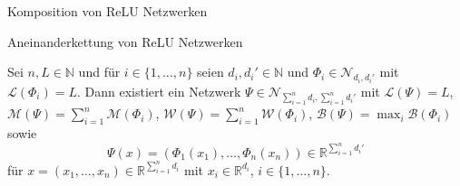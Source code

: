 \documentclass[10pt,aspectratio=169]{beamer}
\newcommand{\N}{\mathbb{N}} %
\newcommand{\R}{\mathbb{R}} %
\newcommand{\set}[1]{\{#1\}}
\begin{document}
\begin{frame}{Komposition von ReLU Netzwerken}
    \centering
\end{frame}

\begin{frame}{Aneinanderkettung von ReLU Netzwerken}
    \begin{lemma}
        Sei \(n, L \in\N\) und für \(i\in \set{1,\ldots, n}\) seien \(d_i, d_i' \in \N\) und \(\Phi_i \in \mathcal{N}_{d_i, d_i'}\) 
        mit \(\mathcal{L}(\Phi_i) = L\). Dann existiert ein Netzwerk \(\Psi \in \mathcal{N}_{\sum_{i=1}^n d_i, \sum_{i=1}^n d_i'}\) 
        mit \(\mathcal{L}(\Psi) = L\), \(\mathcal{M}(\Psi) = \sum_{i=1}^n \mathcal{M}(\Phi_i)\), 
        \(\mathcal{W}(\Psi) = \sum_{i=1}^n \mathcal{W}(\Phi_i)\), \(\mathcal{B}(\Psi) = \max_i \mathcal{B}(\Phi_i)\) sowie 
        \[ \Psi(x) = (\Phi_1(x_1), \ldots, \Phi_n(x_n)) \in \R^{\sum_{i=1}^n d_i'} \]
        für \(x = (x_1, \ldots, x_n) \in \R^{\sum_{i=1}^n d_i}\) mit \(x_i \in \R^{d_i}\), \(i\in \set{1,\ldots, n}\).
    \end{lemma}
\end{frame}
\end{document}
